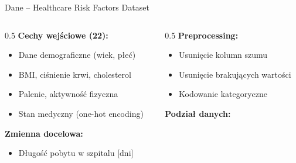 \documentclass[aspectratio=169,12pt]{beamer}
\begin{document}
\begin{frame}{Dane -- Healthcare Risk Factors Dataset}
    \begin{columns}[T]
        \begin{column}{0.5\textwidth}
            \textbf{Cechy wejściowe (22):}
            \begin{itemize}
                \item Dane demograficzne (wiek, płeć)
                \item BMI, ciśnienie krwi, cholesterol
                \item Palenie, aktywność fizyczna
                \item Stan medyczny (one-hot encoding)
            \end{itemize}
            \vspace{0.3cm}
            \textbf{Zmienna docelowa:}
            \begin{itemize}
                \item Długość pobytu w szpitalu [dni]
            \end{itemize}
        \end{column}
        \begin{column}{0.5\textwidth}
            \textbf{Preprocessing:}
            \begin{itemize}
                \item Usunięcie kolumn szumu
                \item Usunięcie brakujących wartości
                \item Kodowanie kategoryczne
            \end{itemize}
            \vspace{0.3cm}
            \textbf{Podział danych:}
            \begin{center}
            \end{center}
        \end{column}
    \end{columns}
\end{frame}
\end{document}
